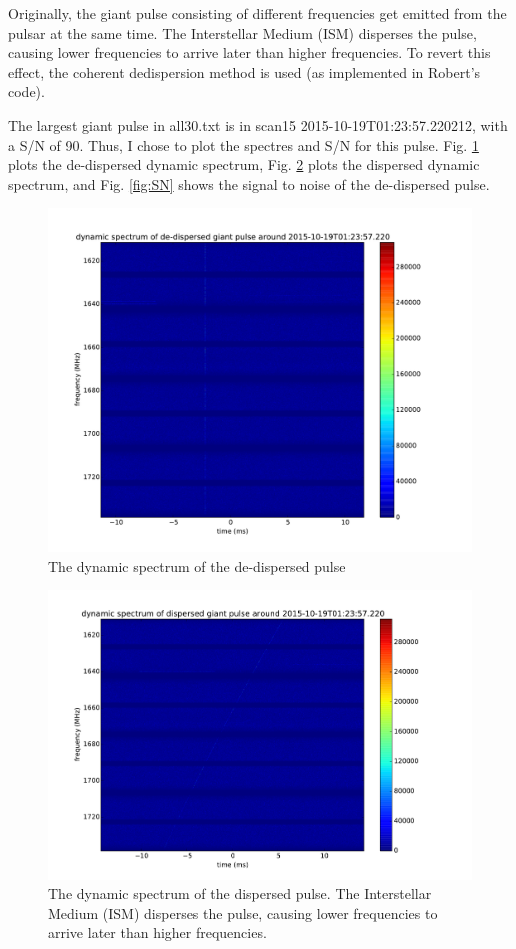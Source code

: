 \documentclass[apj]{emulateapj}
\begin{document}
Originally, the giant pulse consisting of different frequencies get emitted from the pulsar at the same time. The Interstellar Medium (ISM) disperses the pulse, causing lower frequencies to arrive later than higher frequencies.\cite{coherent dedispersion} To revert this effect, the coherent dedispersion method is used (as implemented in Robert's code). 

The largest giant pulse in all30.txt is in scan15 2015-10-19T01:23:57.220212, with a S/N of 90. Thus, I chose to plot the spectres and S/N for this pulse. Fig. \ref{fig:dedispersed} plots the de-dispersed dynamic spectrum, Fig. \ref{fig:dispersed} plots the dispersed dynamic spectrum, and Fig. \ref{fig:SN} shows the signal to noise of the de-dispersed pulse.

\begin{figure}[H]
\includegraphics[width=1.0\columnwidth]{dedispersed_spec.pdf}
\caption{The dynamic spectrum of the de-dispersed pulse}
\label{fig:dedispersed}
\end{figure}

\begin{figure}[H]
\includegraphics[width=1.0\columnwidth]{dispersed_spec.pdf}
\caption{The dynamic spectrum of the dispersed pulse. The Interstellar Medium (ISM) disperses the pulse, causing lower frequencies to arrive later than higher frequencies.\cite{coherent dedispersion}}
\label{fig:dispersed}
\end{figure}
\end{document}
